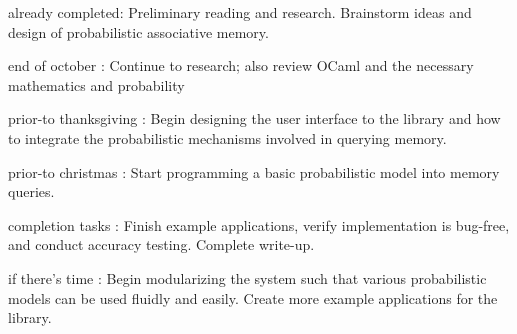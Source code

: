 \documentclass{sig-alternate}
\begin{document}
\begin{itemize*}
	\item {\sc already completed}: Preliminary reading and research. Brainstorm ideas and design of probabilistic associative memory. \vspace{3pt}
	\item {\sc end of october} : Continue to research; also review OCaml and the necessary mathematics and probability\vspace{3pt}
	\item {\sc prior-to thanksgiving} : Begin designing the user interface to the library and how to integrate the probabilistic mechanisms involved in querying memory.\vspace{3pt}
	\item {\sc prior-to christmas} : Start programming a basic probabilistic model into memory queries.\vspace{3pt}
	\item {\sc completion tasks} : Finish example applications, verify implementation is bug-free, and conduct accuracy testing. Complete write-up.\vspace{3pt}
	\item {\sc if there's time} : Begin modularizing the system such that various probabilistic models can be used fluidly and easily. Create more example applications for the library.
\end{itemize*}


\vspace{175pt}
\end{document}
